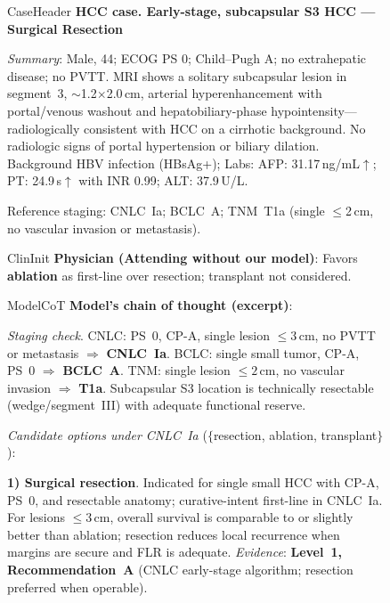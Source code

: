 \documentclass{article}
\begin{document}
\begin{figure}[t]
\centering
\begin{minipage}{0.99\linewidth}
  \begin{bandbox}{CaseHeader}
  \textbf{HCC case. Early-stage, subcapsular S3 HCC — Surgical Resection}

  \textit{Summary}: 
  Male, 44; ECOG PS 0; Child--Pugh A; no extrahepatic disease; no PVTT. 
  MRI shows a solitary subcapsular lesion in segment~3, \(\sim\)1.2\(\times\)2.0\,cm, arterial hyperenhancement with portal/venous washout and hepatobiliary-phase hypointensity—radiologically consistent with HCC on a cirrhotic background. No radiologic signs of portal hypertension or biliary dilation. 
  Background HBV infection (HBsAg+); Labs: AFP: 31.17\,ng/mL\(\uparrow\); PT: 24.9\,s\(\uparrow\) with INR 0.99; ALT: 37.9\,U/L. 
  
  Reference staging: CNLC~Ia; BCLC~A; TNM~T1a (single \(\le\)2\,cm, no vascular invasion or metastasis).
  \end{bandbox}

  \vspace{2pt}
  \begin{bandbox}{ClinInit}
  \textbf{Physician (Attending without our model)}: Favors \textbf{ablation} as first-line over resection; transplant not considered.
  \end{bandbox}

  \vspace{2pt}
  \begin{bandbox}{ModelCoT}
  \textbf{Model’s chain of thought (excerpt)}:

  \textit{Staging check}. CNLC: PS~0, CP-A, single lesion \(\le 3\,\mathrm{cm}\), no PVTT or metastasis \(\Rightarrow\) \textbf{CNLC~Ia}. 
  BCLC: single small tumor, CP-A, PS~0 \(\Rightarrow\) \textbf{BCLC~A}. 
  TNM: single lesion \(\le 2\,\mathrm{cm}\), no vascular invasion \(\Rightarrow\) \textbf{T1a}. 
  Subcapsular S3 location is technically resectable (wedge/segment~III) with adequate functional reserve.

  \medskip
  \textit{Candidate options under CNLC~Ia} (\( \{\)resection, ablation, transplant\(\}\)):

  \textbf{1) Surgical resection}. 
  Indicated for single small HCC with CP-A, PS~0, and resectable anatomy; curative-intent first-line in CNLC~Ia. 
  For lesions \(\le 3\,\mathrm{cm}\), overall survival is comparable to or slightly better than ablation; resection reduces local recurrence when margins are secure and FLR is adequate. 
  \emph{Evidence}: \textbf{Level~1, Recommendation~A} (CNLC early-stage algorithm; resection preferred when operable). 


\end{bandbox}
\end{minipage}
\end{figure}
\end{document}
